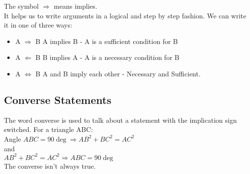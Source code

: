 \documentclass[class=article, crop=false]{standalone}
\begin{document}
The symbol $\Rightarrow$ means implies. \\
It helps us to write arguments in a logical and step by step fashion.
We can write it in one of three ways:
\begin{itemize}
	\item A $\Rightarrow$ B	A implies B - A is a sufficient condition for B
	\item A $\Leftarrow$ B		B implies A - A is a necessary condition for B
	\item A $\iff$ B			A and B imply each other - Necessary and Sufficient.
\end{itemize}
\subsection*{Converse Statements}
The word converse is used to talk about a statement with the implication sign switched. 
For a triangle ABC: \\
Angle $ABC = 90\deg \Rightarrow AB^2 + BC^2 = AC^2$ \\ 
and \\
$AB^2 + BC^2 = AC^2 \Rightarrow ABC = 90\deg$ \\ 

The converse isn't always true.
\end{document}
